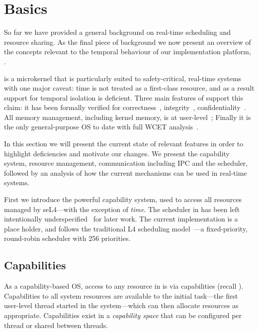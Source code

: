 

\chapter{\selfour Basics}
\label{chap:sel4}

So far we have provided a general background on real-time scheduling and resource sharing.
As the final piece of background we now present an overview of the concepts relevant to the temporal behaviour of our implementation platform, \selfour.

\selfour is a microkernel that is particularly suited to safety-critical, real-time systems
with one major caveat: time is not treated as a first-class resource, and as a result support for
temporal isolation is deficient. Three main features of \selfour
support this claim: it has been formally verified for correctness~\citep{Klein_EHACDEEKNSTW_09,
Klein_AEMSKH_14}, integrity~\citep{Sewell_WGMAK_11}, confidentiality~\citep{Murray_MBGBSLGK_13}.
All memory management, including kernel memory, is at
user-level~\citep{Elkaduwe_Derrin_06}; Finally it is the only general-purpose \gls{OS} to date with full \gls{WCET}
analysis~\citep{Sewell_KH_16}.  

In this section we will present the current state of relevant \selfour features in order to
highlight deficiencies and motivate our changes.  We present the capability system, resource
management, communication including \gls{IPC} and the scheduler, followed by an analysis of
how the current mechanisms can be used in real-time systems.

First we introduce the powerful \selfour capability system, used to access all resources managed by
seL4---with the exception of \emph{time}. The scheduler in \selfour has been left intentionally
underspecified~\citep{Petters_EH_12} for later work.  The current implementation is a place holder,
and follows the traditional L4 scheduling model~\citep{Ruocco_06}---a fixed-priority, round-robin
scheduler with 256 priorities. 


\section{Capabilities}
\label{s:capabilities}

As a capability-based \gls{OS}, access to any resource in \selfour is via capabilities (recall
). Capabilities to all system resources are available to the initial task---the first
user-level thread started in the system---which can then allocate resources as appropriate.
Capabilities exist in a \emph{capability space} that can be configured per thread or shared between
threads. 

